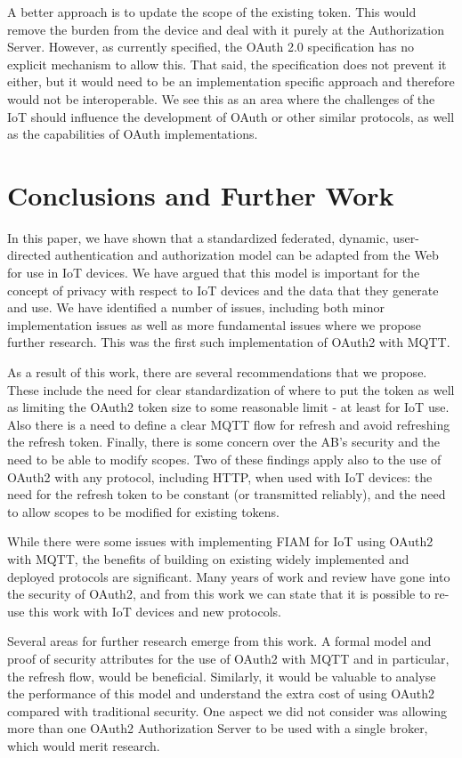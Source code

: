 \documentclass{IEEEtran}
\begin{document}
A better approach is to update the scope of the existing token. This would remove the burden 
from the device and deal with it purely at the Authorization Server. However, as
currently specified, the OAuth 2.0 specification has no explicit mechanism to allow this. That said, 
the specification does not prevent it either, but it would need to be an implementation specific 
approach and therefore would not be interoperable. We see this as an area where the 
challenges of the IoT should influence the development of OAuth or other similar 
protocols, as well as the capabilities of OAuth implementations.

\section{Conclusions and Further Work}\label{sect:conc}
In this paper, we have shown that a standardized federated, dynamic, user-directed authentication and authorization model
can be adapted from the Web for use in IoT devices. We have argued that this model
is important for the concept of privacy with respect to IoT devices and the data that they 
generate and use. We have identified a number of issues, including both minor implementation issues as 
well as more fundamental issues where we propose further research. This was 
the first such implementation of OAuth2 with MQTT.

As a result of this work, there are several recommendations that we propose.  These include the need for clear standardization of where to put the token as well as limiting the OAuth2 token size to some reasonable limit - at least for IoT use. Also there is a need to define a clear MQTT flow for refresh and avoid refreshing the refresh token. Finally, there is some concern over the AB's security and the need to be able to modify scopes.  Two of these findings apply also to the use of OAuth2 with any protocol, including HTTP, when used with IoT devices: the need for the refresh token to be constant (or transmitted reliably), and the need to allow scopes to be modified for existing tokens. 

While there were some issues with implementing FIAM for IoT using OAuth2 with MQTT, the benefits of building on existing widely implemented and deployed protocols are significant. Many years of work and review have gone into the security of OAuth2, and from this work we can state that it is possible to re-use this work with IoT devices and new protocols.

Several areas for further research emerge from this work. A formal model and proof of security attributes for the use of OAuth2 with MQTT and in particular, the refresh flow, would be beneficial. Similarly, it would be valuable to analyse the performance of this model and understand the extra cost of using OAuth2 compared with traditional security. One aspect we did not consider was allowing more than one OAuth2 Authorization Server to be used with a single broker, which would merit research.
\end{document}
